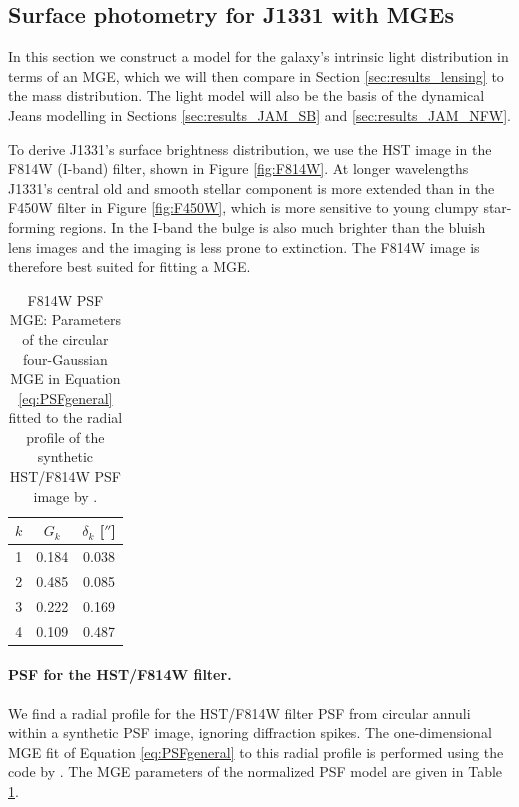 \subsection{Surface photometry for J1331 with MGEs} \label{sec:MGE_results}

In this section we construct a model for the galaxy's intrinsic light distribution in terms of an MGE, which we will then compare in Section \ref{sec:results_lensing} to the mass distribution. The light model will also be the basis of the dynamical Jeans modelling in Sections \ref{sec:results_JAM_SB} and \ref{sec:results_JAM_NFW}.

To derive J1331's surface brightness distribution, we use the HST image in the F814W (I-band) filter, shown in Figure \ref{fig:F814W}. At longer wavelengths J1331's central old and smooth stellar component is more extended than in the F450W filter in Figure \ref{fig:F450W}, which is more sensitive to young clumpy star-forming regions. In the I-band the bulge is also much brighter than the bluish lens images and the imaging is less prone to extinction. The F814W image is therefore best suited for fitting a MGE. 

\begin{table}
\centering
\caption{F814W PSF MGE: Parameters of the circular four-Gaussian MGE in Equation \eqref{eq:PSFgeneral} fitted to the radial profile of the synthetic HST/F814W PSF image by \Wilma{[TO DO: WHO???]}.}
\begin{tabular}{ccc}
\hline
$k$ & $G_k$ & $\delta_k$ [$''$] \\\hline
1 & 0.184 & 0.038\\
2 & 0.485 & 0.085\\
3 & 0.222 & 0.169\\
4 & 0.109 & 0.487\\\hline
\end{tabular}
\label{tab:PSFMGEF814W}
\end{table}


\paragraph{PSF for the HST/F814W filter.} We find a radial profile for the HST/F814W filter PSF from circular annuli within a synthetic PSF image, ignoring diffraction spikes. The one-dimensional MGE fit of Equation \eqref{eq:PSFgeneral} to this radial profile is performed using the code by \citet{Cap02}. The MGE parameters of the normalized PSF model are given in Table \ref{tab:PSFMGEF814W}.

